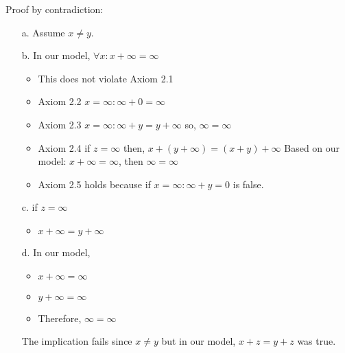 \documentclass[12pt]{article}
\begin{document}
\begin{enumerate}
  Proof by contradiction:
  \begin{enumerate}
    \item[a.] Assume ${x \neq y}$.
    \item[b.] In our model, ${\forall x : x + \infty = \infty}$ 
      \begin{itemize}
        \item This does not violate Axiom 2.1
        \item Axiom 2.2 ${x = \infty : \infty + 0 = \infty}$
        \item Axiom 2.3 ${x = \infty : \infty + y = y + \infty}$ so, ${\infty = \infty}$
        \item Axiom 2.4 if ${z = \infty}$ then, ${x + (y + \infty) = (x + y) + \infty}$
          Based on our model: ${x + \infty = \infty}$, then ${\infty = \infty}$
        \item Axiom 2.5 holds because if ${x = \infty : \infty + y = 0}$ is false.
      \end{itemize}
    \item[c.] if ${z = \infty}$
      \begin{itemize}
        \item ${x + \infty = y + \infty}$
      \end{itemize}
    \item[d.] In our model,
      \begin{itemize}
        \item ${x + \infty = \infty}$
        \item ${y + \infty = \infty}$
        \item Therefore, ${\infty = \infty}$
      \end{itemize}

      The implication fails since ${x \neq y}$ but in our model, ${x + z = y + z}$ was true.
  \end{enumerate}


\end{enumerate}
\end{document}
